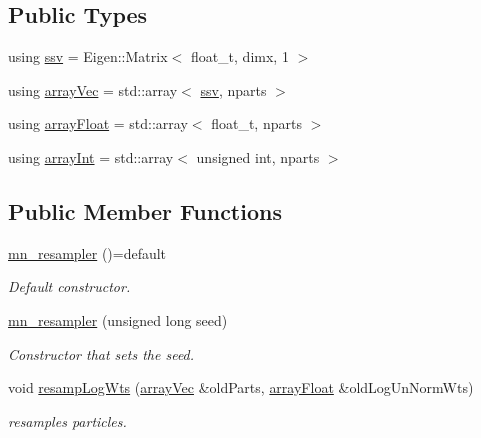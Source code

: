 \subsection*{Public Types}
\begin{DoxyCompactItemize}
\item 
using \hyperlink{classmn__resampler_a1cb075b42f73e01de7fc1b27f51bfc4c}{ssv} = Eigen\+::\+Matrix$<$ float\+\_\+t, dimx, 1 $>$
\item 
using \hyperlink{classmn__resampler_aa8ff37576399807b14a7a12615032bb1}{array\+Vec} = std\+::array$<$ \hyperlink{classrbase_ae20e0b8df15aa109252f57ecbf1f20f8}{ssv}, nparts $>$
\item 
using \hyperlink{classmn__resampler_ae26be2889cf3cd4ddea66928d879809e}{array\+Float} = std\+::array$<$ float\+\_\+t, nparts $>$
\item 
using \hyperlink{classmn__resampler_afb5d000e2464afef813792c57c42599b}{array\+Int} = std\+::array$<$ unsigned int, nparts $>$
\end{DoxyCompactItemize}
\subsection*{Public Member Functions}
\begin{DoxyCompactItemize}
\item 
\mbox{\label{classmn__resampler_a016a00570c30806a0fdad25385395f95}} 
\hyperlink{classmn__resampler_a016a00570c30806a0fdad25385395f95}{mn\+\_\+resampler} ()=default
\begin{DoxyCompactList}\small\item\em Default constructor. \end{DoxyCompactList}\item 
\hyperlink{classmn__resampler_a179cbea35530cf7e171b1d214e1d9776}{mn\+\_\+resampler} (unsigned long seed)
\begin{DoxyCompactList}\small\item\em Constructor that sets the seed. \end{DoxyCompactList}\item 
void \hyperlink{classmn__resampler_a13b1897e180a791a3a099d5d6329a125}{resamp\+Log\+Wts} (\hyperlink{classrbase_aa12fc826befa6ba0647b5f59ebc396ee}{array\+Vec} \&old\+Parts, \hyperlink{classrbase_a6f76bef853e508cb5b6f546d231b06f5}{array\+Float} \&old\+Log\+Un\+Norm\+Wts)
\begin{DoxyCompactList}\small\item\em resamples particles. \end{DoxyCompactList}\end{DoxyCompactItemize}
